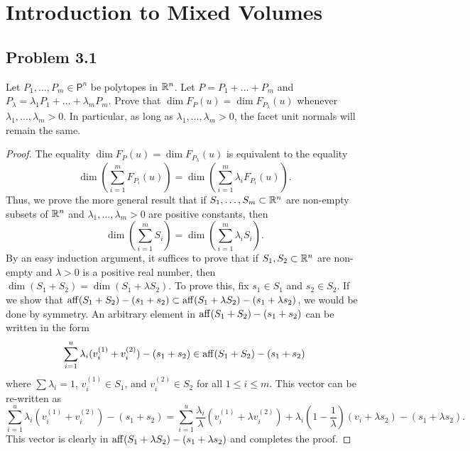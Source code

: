 \documentclass[12pt]{article}
\begin{document}
\newpage 

\section{Introduction to Mixed Volumes}
\subsection{Problem 3.1}

\begin{problem}
	 Let $P_1, \ldots, P_m \in \mathsf{P}^n$ be polytopes in $\mathbb{R}^n$. Let $P = P_1 + \ldots + P_m$ and $P_\lambda = \lambda_1 P_1 + \ldots + \lambda_m P_m$. Prove that $\dim F_P(u) = \dim F_{P_\lambda}(u)$ whenever $\lambda_1, \ldots, \lambda_m > 0$. In particular, as long as $\lambda_1, \ldots, \lambda_m > 0$, the facet unit normals will remain the same.
\end{problem}

\begin{proof}
	The equality $\dim F_P(u) = \dim F_{P_\lambda}(u)$ is equivalent to the equality
	\[
		\dim \left ( \sum_{i = 1}^m F_{P_i}(u) \right ) = \dim \left ( \sum_{i = 1}^m \lambda_i F_{P_i}(u) \right ). 
	\]
	Thus, we prove the more general result that if $S_1, \ldots, S_m \subset \mathbb{R}^n$ are non-empty subsets of $\mathbb{R}^n$ and $\lambda_1, \ldots, \lambda_m > 0$ are positive constants, then 
	\[
		\dim \left ( \sum_{i = 1}^m S_i \right ) = \dim \left ( \sum_{i = 1}^m \lambda_i S_i \right ).
	\]
	By an easy induction argument, it suffices to prove that if $S_1, S_2 \subset \mathbb{R}^n$ are non-empty and $\lambda > 0$ is a positive real number, then $\dim (S_1 + S_2) = \dim (S_1 + \lambda S_2)$. To prove this, fix $s_1 \in S_1$ and $s_2 \in S_2$. If we show that $\operatorname{aff} (S_1 + S_2) - (s_1 + s_2) \subset \operatorname{aff} (S_1 + \lambda S_2) - (s_1 + \lambda s_2)$, we would be done by symmetry. An arbitrary element in $\operatorname{aff} (S_1 + S_2) - (s_1 + s_2)$ can be written in the form 
	\[
		\sum_{i = 1}^u \lambda_i (v_i^{(1)} + v_i^{(2)}) - (s_1 + s_2) \in \operatorname{aff} (S_1 + S_2) - (s_1 + s_2)
	\]
	where $\sum \lambda_i = 1$, $v_i^{(1)} \in S_1$, and $v_i^{(2)} \in S_2$ for all $1 \leq i \leq m$. This vector can be re-written as 
	\[
		\sum_{i = 1}^u \lambda_i (v_i^{(1)} + v_i^{(2)}) - (s_1 + s_2) = \sum_{i = 1}^u \frac{\lambda_i}{\lambda} (v_i^{(1)} + \lambda v_i^{(2)}) + \lambda_i \left ( 1- \frac{1}{\lambda} \right ) (v_i + \lambda s_2) - (s_1 + \lambda s_2).
	\] 
	This vector is clearly in $\operatorname{aff} (S_1 + \lambda S_2) - (s_1 + \lambda s_2)$ and completes the proof.
\end{proof}
\end{document}
